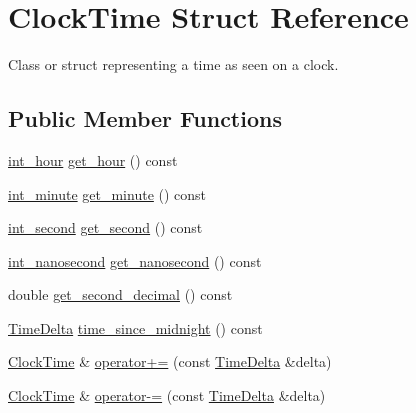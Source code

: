 \hypertarget{structClockTime}{\section{\-Clock\-Time \-Struct \-Reference}
\label{structClockTime}
}


\-Class or struct representing a time as seen on a clock.  


\subsection*{\-Public \-Member \-Functions}
\begin{DoxyCompactItemize}
\item 
\hyperlink{types_8h_a62ed583cd6a13da9650111e3b4b4eedc}{int\-\_\-hour} \hyperlink{structClockTime_ab188f450c2b8519296c96529afc8d92f}{get\-\_\-hour} () const 
\item 
\hyperlink{types_8h_a3e55debfc84cabacf28bddf2d04984c9}{int\-\_\-minute} \hyperlink{structClockTime_ae882482085d1cc290b055381f407cb6a}{get\-\_\-minute} () const 
\item 
\hyperlink{types_8h_abd3494f4b69b446ec1fc0477a8b769c9}{int\-\_\-second} \hyperlink{structClockTime_a054e575b6ba259efdf3d79ebdf7fc501}{get\-\_\-second} () const 
\item 
\hyperlink{types_8h_a153ef9bf3a8448179ab1d606f5593b4c}{int\-\_\-nanosecond} \hyperlink{structClockTime_a4ddf3b506ad8f3576df034fbf3febae4}{get\-\_\-nanosecond} () const 
\item 
double \hyperlink{structClockTime_a174f09985d45efc748ca956c9ca2fb2e}{get\-\_\-second\-\_\-decimal} () const 
\item 
\hyperlink{structTimeDelta}{\-Time\-Delta} \hyperlink{structClockTime_a9c6423703cb0026435fb6e5b2d261d54}{time\-\_\-since\-\_\-midnight} () const 
\item 
\hyperlink{structClockTime}{\-Clock\-Time} \& \hyperlink{structClockTime_a8a98c385f805022b1bc229e472e8c1e9}{operator+=} (const \hyperlink{structTimeDelta}{\-Time\-Delta} \&delta)
\item 
\hyperlink{structClockTime}{\-Clock\-Time} \& \hyperlink{structClockTime_a50a16387217243bc8986735c7cebd012}{operator-\/=} (const \hyperlink{structTimeDelta}{\-Time\-Delta} \&delta)
\end{DoxyCompactItemize}
